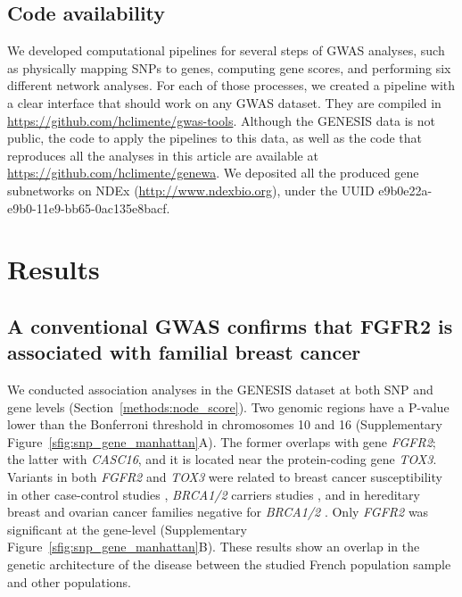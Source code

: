 \documentclass[twocolumn, 11pt]{article}
\begin{document}
\subsection{Code availability}

We developed computational pipelines for several steps of GWAS analyses, such as physically mapping SNPs to genes, computing gene scores, and performing six different network analyses. For each of those processes, we created a pipeline with a clear interface that should work on any GWAS dataset. They are compiled in \url{https://github.com/hclimente/gwas-tools}. Although the GENESIS data is not public, the code to apply the pipelines to this data, as well as the code that reproduces all the analyses in this article are available at \url{https://github.com/hclimente/genewa}. We deposited all the produced gene subnetworks on NDEx (\url{http://www.ndexbio.org}), under the UUID e9b0e22a-e9b0-11e9-bb65-0ac135e8bacf.

\section{Results}

\subsection{A conventional GWAS confirms that FGFR2 is associated with familial breast cancer}
\label{results:conventional}

We conducted association analyses in the GENESIS dataset at both SNP and gene levels (Section~\ref{methods:node_score}). Two genomic regions have a P-value lower than the Bonferroni threshold in chromosomes 10 and 16 (Supplementary Figure~\ref{sfig:snp_gene_manhattan}A). The former overlaps with gene \emph{FGFR2}; the latter with \emph{CASC16}, and it is located near the protein-coding gene \emph{TOX3}. Variants in both \emph{FGFR2} and \emph{TOX3} were related to breast cancer susceptibility in other case-control studies \cite{Michailidou2017}, \emph{BRCA1/2} carriers studies \cite{Mulligan2011}, and in hereditary breast and ovarian cancer families negative for \emph{BRCA1/2} \cite{rinella_genetic_2013}. Only \emph{FGFR2} was significant at the gene-level (Supplementary Figure~\ref{sfig:snp_gene_manhattan}B). These results show an overlap in the genetic architecture of the disease between the studied French population sample and other populations.
\end{document}
